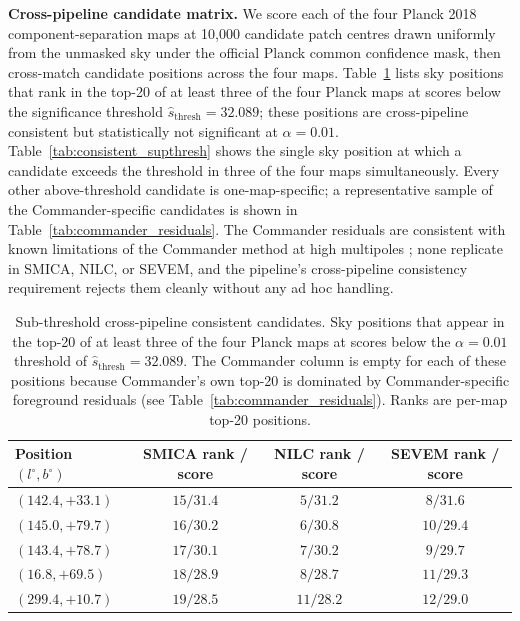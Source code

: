 \documentclass[preprint,12pt,nonatbib]{elsarticle}
\begin{document}
\textbf{Cross-pipeline candidate matrix.} We score each of the four Planck 2018 component-separation maps at 10{,}000 candidate patch centres drawn uniformly from the unmasked sky under the official Planck common confidence mask, then cross-match candidate positions across the four maps. Table~\ref{tab:consistent_subthresh} lists sky positions that rank in the top-20 of at least three of the four Planck maps at scores below the significance threshold $\hat{s}_{\text{thresh}} = 32.089$; these positions are cross-pipeline consistent but statistically not significant at $\alpha = 0.01$. Table~\ref{tab:consistent_supthresh} shows the single sky position at which a candidate exceeds the threshold in three of the four maps simultaneously. Every other above-threshold candidate is one-map-specific; a representative sample of the Commander-specific candidates is shown in Table~\ref{tab:commander_residuals}. The Commander residuals are consistent with known limitations of the Commander method at high multipoles \citep{planck2018_iv}; none replicate in SMICA, NILC, or SEVEM, and the pipeline's cross-pipeline consistency requirement rejects them cleanly without any ad hoc handling.

\begin{table}[t]
\centering
\caption{Sub-threshold cross-pipeline consistent candidates. Sky positions that appear in the top-20 of at least three of the four Planck maps at scores below the $\alpha = 0.01$ threshold of $\hat{s}_{\text{thresh}} = 32.089$. The Commander column is empty for each of these positions because Commander's own top-20 is dominated by Commander-specific foreground residuals (see Table~\ref{tab:commander_residuals}). Ranks are per-map top-20 positions.}
\label{tab:consistent_subthresh}
\begin{tabular}{lccc}
\toprule
Position $(l^\circ, b^\circ)$ & SMICA rank / score & NILC rank / score & SEVEM rank / score \\
\midrule
$(142.4, +33.1)$ & $15 / 31.4$ & $5 / 31.2$ & $8 / 31.6$ \\
$(145.0, +79.7)$ & $16 / 30.2$ & $6 / 30.8$ & $10 / 29.4$ \\
$(143.4, +78.7)$ & $17 / 30.1$ & $7 / 30.2$ & $9 / 29.7$ \\
$(16.8, +69.5)$  & $18 / 28.9$ & $8 / 28.7$ & $11 / 29.3$ \\
$(299.4, +10.7)$ & $19 / 28.5$ & $11 / 28.2$ & $12 / 29.0$ \\
\bottomrule
\end{tabular}
\end{table}
\end{document}
